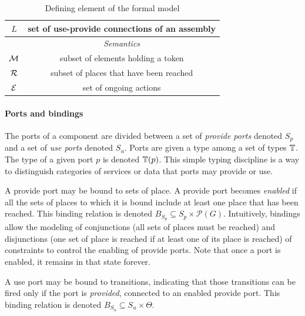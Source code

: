 \begin{table}[tp]
{\begin{tabular}{|c|c|}
      $L$ & set of use-provide connections of an assembly\\
      \hline
      \hline
      & \emph{Semantics}\\
      \hline
      $\mathcal{M}$ & subset of elements holding a token\\
      $\mathcal{R}$ & subset of places that have been reached\\
      $\mathcal{E}$ & set of ongoing actions\\
      \hline
    \end{tabular}
  }
  \caption{Defining element of the \mad formal model}
  \label{tab:not}
\end{table}

\paragraph{Ports and bindings}{

The ports of a component are divided between a set of \emph{provide
  ports} denoted $S_p$ and a set of \emph{use ports} denoted
$S_u$. Ports are given a type among a set of types $\mathbb{T}$. The type
of a given port $p$ is denoted $\mathbb{T}(p)$. This simple typing
discipline is a way to distinguish categories of services or data that
ports may provide or use.

A provide port may be bound to sets of place. A provide port becomes
\emph{enabled} if all the sets of places to which it is bound include
at least one place that has been reached. This binding relation is
denoted $B_{S_p} \subseteq S_p \times \mathcal{P}(G)$. Intuitively,
bindings allow the modeling of conjunctions (all sets of places must
be reached) and disjunctions (one set of place is reached if at least
one of its place is reached) of constraints to control the enabling of
provide ports. Note that once a port is enabled, it remains in that
state forever.

A use port may be bound to transitions, indicating that those
transitions can be fired only if the port is \emph{provided}, \ie
connected to an enabled provide port. This binding relation is denoted
$B_{S_{u}} \subseteq S_u \times \Theta$.



}
